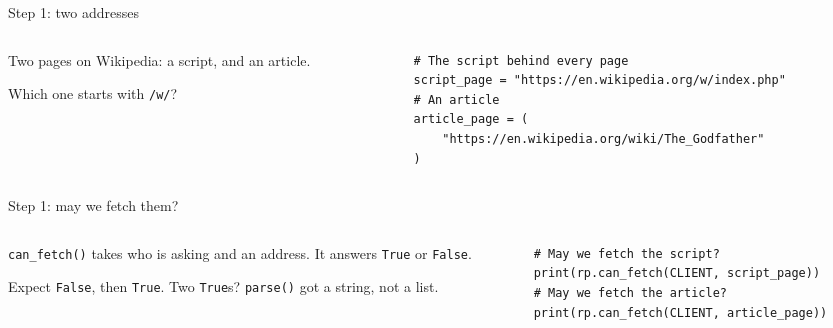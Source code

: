 \documentclass[9pt,aspectratio=169]{beamer}
\begin{document}
\begin{frame}[fragile]{Step 1: two addresses}
    \begin{columns}[T]
        \begin{column}{0.37\textwidth}
            Two pages on Wikipedia: a script, and an article.

            \medskip
            Which one starts with \texttt{/w/}?
        \end{column}
        \begin{column}{0.6\textwidth}
\begin{lstlisting}
# The script behind every page
script_page = "https://en.wikipedia.org/w/index.php"
# An article
article_page = (
    "https://en.wikipedia.org/wiki/The_Godfather"
)
\end{lstlisting}
        \end{column}
    \end{columns}
\end{frame}

\begin{frame}[fragile]{Step 1: may we fetch them?}
    \begin{columns}[T]
        \begin{column}{0.37\textwidth}
            \texttt{can\_fetch()} takes who is asking and an address. It answers \texttt{True} or \texttt{False}.

            \medskip
            Expect \texttt{False}, then \texttt{True}. Two \texttt{True}s? \texttt{parse()} got a string, not a list.
        \end{column}
        \begin{column}{0.6\textwidth}
\begin{lstlisting}
# May we fetch the script?
print(rp.can_fetch(CLIENT, script_page))
# May we fetch the article?
print(rp.can_fetch(CLIENT, article_page))
\end{lstlisting}
        \end{column}
    \end{columns}
\end{frame}
\end{document}
